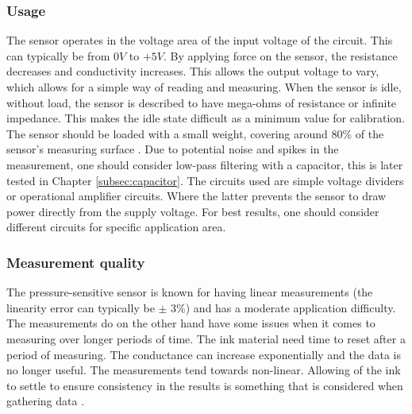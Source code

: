 \subsubsection{Usage}
The sensor operates in the voltage area of the input voltage of the circuit. This can typically be from $0V$ to $+5V$. By applying force on the sensor, the resistance decreases and conductivity increases. This allows the output voltage to vary, which allows for a simple way of reading and measuring. When the sensor is idle, without load, the sensor is described to have mega-ohms of resistance or infinite impedance. This makes the idle state difficult as a minimum value for calibration. The sensor should be loaded with a small weight, covering around 80\% of the sensor's measuring surface \citep[10.3, p.418]{handbook}. Due to potential noise and spikes in the measurement, one should consider low-pass filtering with a capacitor, this is later tested in Chapter \ref{subsec:capacitor}.
The circuits used are simple voltage dividers or operational amplifier circuits. Where the latter prevents the sensor to draw power directly from the supply voltage. For best results, one should consider different circuits for specific application area.

\subsubsection{Measurement quality}
The pressure-sensitive sensor is known for having linear measurements (the linearity error can typically be $\pm$ 3\%) and has a moderate application difficulty. The measurements do on the other hand have some issues when it comes to measuring over longer periods of time. The ink material need time to reset after a period of measuring. The conductance can increase exponentially and the data is no longer useful. The measurements tend towards non-linear.
Allowing of the ink to settle to ensure consistency in the results is something that is considered when gathering data \citep{vecchi_experimental_2000}.

